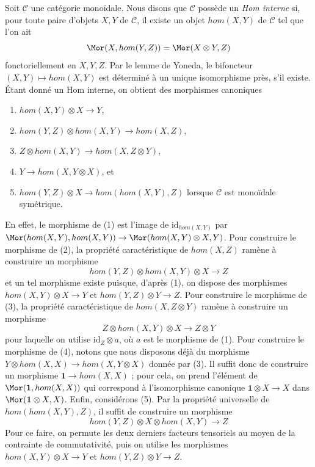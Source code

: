 \begin{remark}
\label{remark-internal-hom-monoidal}
Soit $\mathcal{C}$ une catégorie monoïdale. Nous disons que $\mathcal{C}$
possède un {\it Hom interne} si, pour toute paire d'objets $X, Y$ de
$\mathcal{C}$, il existe un objet $hom(X, Y)$ de $\mathcal{C}$ tel que l'on ait
$$
\Mor(X, hom(Y, Z)) = \Mor(X \otimes Y, Z)
$$
fonctoriellement en $X, Y, Z$. Par le lemme de Yoneda, le bifoncteur
$(X, Y) \mapsto hom(X, Y)$ est déterminé à un unique isomorphisme près,
s'il existe. Étant donné un Hom interne, on obtient des morphismes canoniques
\begin{enumerate}
\item $hom(X, Y) \otimes X \to Y$,
\item $hom(Y, Z) \otimes hom(X, Y) \to hom(X, Z)$,
\item $Z \otimes hom(X, Y) \to hom(X, Z \otimes Y)$,
\item $Y \to hom(X, Y \otimes X)$, et
\item $hom(Y, Z) \otimes X \to hom(hom(X, Y), Z)$ lorsque
$\mathcal{C}$ est monoïdale symétrique.
\end{enumerate}
En effet, le morphisme de (1) est l'image de $\text{id}_{hom(X, Y)}$
par $\Mor(hom(X, Y), hom(X, Y)) \to \Mor(hom(X, Y) \otimes X, Y)$.
Pour construire le morphisme de (2), la propriété caractéristique de
$hom(X, Z)$ ramène à construire un morphisme
$$
hom(Y, Z) \otimes hom(X, Y) \otimes X \longrightarrow Z
$$
et un tel morphisme existe puisque, d'après (1), on dispose des
morphismes $hom(X, Y) \otimes X \to Y$ et $hom(Y, Z) \otimes Y \to Z$.
Pour construire le morphisme de (3), la propriété caractéristique de
$hom(X, Z \otimes Y)$ ramène à construire un morphisme
$$
Z \otimes hom(X, Y) \otimes X \to Z \otimes Y
$$
pour laquelle on utilise $\text{id}_Z \otimes a$, où
$a$ est le morphisme de (1). Pour construire le morphisme de (4),
notons que nous disposons déjà du morphisme
$Y \otimes hom(X, X) \to hom(X, Y \otimes X)$ donnée par (3).
Il suffit donc de construire un morphisme $\mathbf{1} \to hom(X, X)$ ;
pour cela, on prend l'élément de $\Mor(\mathbf{1}, hom(X, X))$
qui correspond à l'isomorphisme canonique $\mathbf{1} \otimes X \to X$
dans $\Mor(\mathbf{1} \otimes X, X)$.
Enfin, considérons (5). Par la propriété universelle de
$hom(hom(X, Y), Z)$, il suffit de construire un morphisme
$$
hom(Y, Z) \otimes X \otimes hom(X, Y) \longrightarrow Z
$$
Pour ce faire, on permute les deux derniers facteurs tensoriels au moyen de la
contrainte de commutativité, puis on utilise les morphismes
$hom(X, Y) \otimes X \to Y$ et $hom(Y, Z) \otimes Y \to Z$.
\end{remark}





